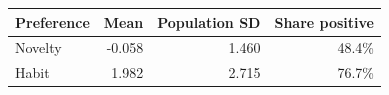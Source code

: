 \begin{tabular}{lrrr}\toprule
Preference & Mean & Population SD & Share positive\\\midrule
Novelty & -0.058 & 1.460 & 48.4\% \\
Habit & 1.982 & 2.715 & 76.7\% \\
\bottomrule\end{tabular}
